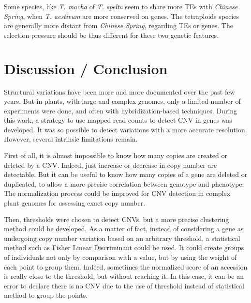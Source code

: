 \documentclass[a4paper, 12pt]{article}
\begin{document}
\begin{onehalfspace}
Some species, like \textit{T. macha} of \textit{T. spelta} seem to share more TEs with \textit{Chinese Spring}, when \textit{T. aestivum} are more conserved on genes. The tetraploids species are generally more distant from \textit{Chinese Spring}, regarding TEs or genes. The selection pressure should be thus different for these two genetic features.


\part{Discussion / Conclusion}
\setcounter{section}{0}

Structural variations have been more and more documented over the past few years. But in plants, with large and complex genomes, only a limited number of experiments were done, and often with hybridization-based techniques. During this work, a strategy to use mapped read counts to detect CNV in genes was developed. It was so possible to detect variations with a more accurate resolution. However, several intrinsic limitations remain.

First of all, it is almost impossible to know how many copies are created or deleted by a CNV. Indeed, just increase or decrease in copy number are detectable. But it can be useful to know how many copies of a gene are deleted or duplicated, to allow a more precise correlation between genotype and phenotype. The normalization process could be improved for CNV detection in complex plant genomes for assessing exact copy number.

Then, thresholds were chosen to detect CNVs, but a more precise clustering method could be developed. As a matter of fact, instead of considering a gene as undergoing copy number variation based on an arbitrary threshold,  a statistical method such as Fisher Linear Discriminant could be used. It could create groups of individuals not only by comparison with a value, but by using the weight of each point to group them. Indeed, sometimes the normalized score of an accession is really close to the threshold, but without reaching it. In this case, it can be an error to declare there is no CNV due to the use of threshold instead of statistical method to group the points. 

\newpage %
\thispagestyle{empty}
~
\addtocounter{page}{-1}
\newpage
\clearpage %


\end{onehalfspace}
\end{document}
